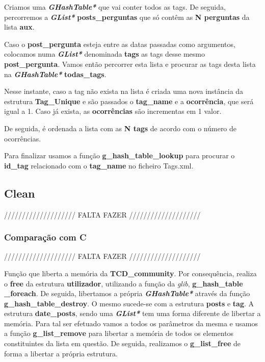 \documentclass[a4paper]{article}
\begin{document}
Criamos uma \textit{\textbf{GHashTable*}} que vai conter todos as tags.
De seguida, percorremos a \textit{\textbf{GList*}} \textbf{posts\_perguntas}
que só contêm as \textbf{N perguntas} da lista \textbf{aux}.

Caso o \textbf{post\_pergunta} esteja entre as datas passadas como argumentos,
colocamos numa \textit{\textbf{GList*}} denominada \textbf{tags} as tags desse
mesmo \textbf{post\_pergunta}. Vamos então percorrer esta lista e procurar
as tags desta lista na \textit{\textbf{GHashTable*}} \textbf{todas\_tags}.

Nesse instante, caso a tag não exista na lista é criada uma nova instância
da estrutura \textbf{Tag\_Unique} e são passados o \textbf{tag\_name} e
a \textbf{ocorrência}, que será igual a 1. Caso já exista, as 
\textbf{ocorrências} são incrementas em 1 valor.

De seguida, é ordenada a lista com as \textbf{N tags} de acordo com o
número de ocorrências. 

Para finalizar usamos a função \textbf{g\_hash\_table\_lookup} para procurar
o \textbf{id\_tag} relacionado com o \textbf{tag\_name} no ficheiro Tags.xml.

\subsection{Clean}

//////////////////// FALTA FAZER ////////////////////

\subsubsection{Comparação com C}

//////////////////// FALTA FAZER ////////////////////

Função que liberta a memória da \textbf{TCD\_community}. Por consequência,
realiza o \textbf{free} da estrutura \textbf{utilizador}, utilizando a 
função da \textit{glib}, \textbf{g\_hash\_table} \textbf{\_foreach}. 
De seguida, libertamos a própria \textit{\textbf{GHashTable*}} através da 
função \textbf{g\_hash\_table\_destroy}. O mesmo sucede-se com a estrutura
\textbf{posts} e \textbf{tag}. A estrutura \textbf{date\_posts}, sendo
uma \textit{\textbf{GList*}} tem uma forma diferente de libertar a 
memória. Para tal ser efetuado vamos a todos os parâmetros da mesma
e usamos a função \textbf{g\_list\_remove} para libertar a memória
de todos os elementos constituintes da lista em questão. De seguida,
realizamos o \textbf{g\_list\_free} de forma a libertar a própria 
estrutura.
\end{document}
